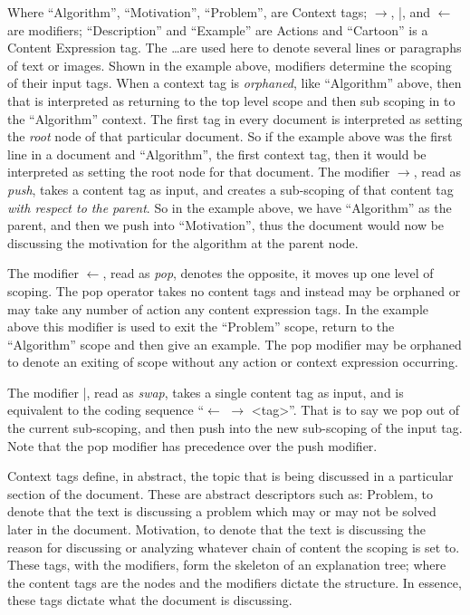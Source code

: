 \documentclass[sigconf]{acmart}
\begin{document}
Where ``Algorithm'', ``Motivation'', ``Problem'', are Context tags; $\rightarrow$,
|, and $\leftarrow$ are modifiers; ``Description'' and ``Example'' are Actions and
``Cartoon'' is a Content Expression tag. The \ldots are used here to denote
several lines or paragraphs of text or images. 
Shown in the example above, modifiers determine the scoping of their input tags.
When a context tag is \emph{orphaned}, like ``Algorithm'' above, then that is
interpreted as returning to the top level scope and then sub scoping in to the
``Algorithm'' context. The first tag in every document is interpreted as setting
the \emph{root} node of that particular document. So if the example above was
the first line in a document and ``Algorithm'', the first context tag, then it
would be interpreted as setting the root node for that document. The modifier
$\rightarrow$, read as \emph{push}, takes a content tag as input, and creates a
sub-scoping of that content tag \emph{with respect to the parent}. So in the
example above, we have ``Algorithm'' as the parent, and then we push into
``Motivation'', thus the document would now be discussing the motivation for the
algorithm at the parent node.

The modifier $\leftarrow$, read as \emph{pop}, denotes the opposite, it moves up one
level of scoping. The pop operator takes no content tags and instead may be
orphaned or may take any number of action any content expression tags. In the
example above this modifier is used to exit the ``Problem'' scope, return to the
``Algorithm'' scope and then give an example. The pop modifier may be orphaned
to denote an exiting of scope without any action or context expression occurring.

The modifier |, read as \emph{swap}, takes a single content tag as input, and is
equivalent to the coding sequence ``$\leftarrow$ $\rightarrow$ <tag>''. That is
to say we pop out of the current sub-scoping, and then push into the new
sub-scoping of the input tag. Note that the pop modifier has precedence over the
push modifier.

Context tags define, in abstract, the topic that is being discussed in a
particular section of the document. These are abstract descriptors such as:
Problem, to denote that the text is discussing a problem which may or may not be
solved later in the document. Motivation, to denote that the text is discussing
the reason for discussing or analyzing whatever chain of content the scoping is
set to. These tags, with the modifiers, form the skeleton of an explanation
tree; where the content tags are the nodes and the modifiers dictate the
structure. In essence, these tags dictate what the document is discussing.
\end{document}
